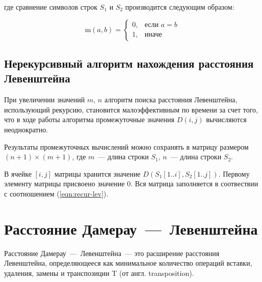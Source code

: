 \noindent где сравнение символов строк $S_1$ и $S_2$ производится следующим образом:

\begin{equation}
    \text{m}(a, b) = 
    \begin{cases}
        0, &\text{если $a = b$}\\
        1, &\text{иначе}
    \end{cases}
\end{equation}

\subsection{Нерекурсивный алгоритм нахождения расстояния Левенштейна}
При увеличении значений $m$, $n$ алгоритм поиска расстояния Левенштейна, использующий рекурсию, становится малоэффективным по времени за счет того, что в ходе работы алгоритма промежуточные значения $D(i, j)$ вычисляются неоднократно.

Результаты промежуточных вычислений можно сохранять в матрицу размером $(n + 1) \times (m + 1)$, где $m$~--- длина строки $S_1$, $n$~--- длина строки $S_2$.

В ячейке $[i, j]$ матрицы хранится значение $D(S_1[1..i], S_2[1..j])$.
Первому элементу матрицы присвоено значение $0$.
Вся матрица заполняется в соотвествии с соотношением (\ref{eqn:recur-lev}).

\section{\texorpdfstring{Расстояние Дамерау~---~Левенштейна}{}}

Расстояние Дамерау~---~Левенштейна~--- это расширение расстояния Левенштейна, определяющееся как минимальное количество операций вставки, удаления, замены и транспозиции T (от англ. transposition).

